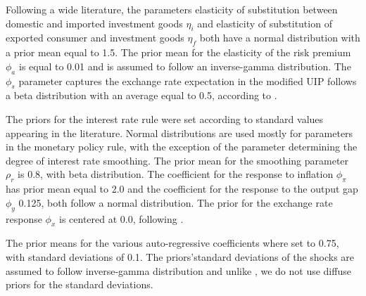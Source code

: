 \documentclass[12pt,oneside,a4paper]{article}
\begin{document}
Following a wide literature, the parameters elasticity of substitution between domestic and imported investment goods $\eta_i$ and elasticity of substitution of exported consumer and investment goods $\eta_f$ both have a normal distribution with a prior mean equal to 1.5. The prior mean for the elasticity of the risk premium $\phi_a$ is equal to 0.01 and is assumed to follow an inverse-gamma distribution. The $\phi_s$ parameter captures the exchange rate expectation in the modified UIP follows a beta distribution with an average equal to 0.5, according to \citet{Adolfson:2008}.

The priors for the interest rate rule were set according to standard values appearing in the literature. Normal distributions are used mostly for parameters in the monetary policy rule, with the exception of the parameter determining the degree of interest rate smoothing. The prior mean for the smoothing parameter $\rho_r$ is $0.8$, with beta distribution. The coefficient for the response to inflation $\phi_{\pi}$ has prior mean equal to 2.0 and the coefficient for the response to the output gap $\phi_{y}$ 0.125, both follow a normal distribution. The prior for the exchange rate response $\phi_{x}$ is centered at 0.0, following \citet{Adolfson:2007}.

The prior means for the various auto-regressive coefficients where set to 0.75, with standard deviations of 0.1. The priors’standard deviations of the shocks are assumed to follow inverse-gamma distribution and unlike \citet{Castro:2015}, we do not use diffuse priors for the standard deviations.
\end{document}
